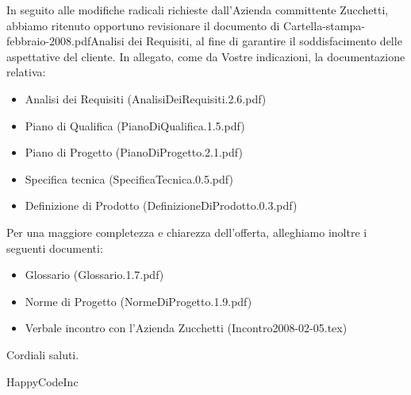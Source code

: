 \documentclass[11pt,titlepage,a4paper]{report}
\begin{document}
In seguito alle modifiche radicali richieste dall'Azienda committente Zucchetti, abbiamo ritenuto opportuno revisionare il documento di Cartella-stampa-febbraio-2008.pdfAnalisi dei Requisiti, al fine di garantire il soddisfacimento delle aspettative del cliente. \newline
In allegato, come da Vostre indicazioni, la documentazione relativa:
\begin{itemize}
\item{}Analisi dei Requisiti (AnalisiDeiRequisiti.2.6.pdf)
\item{}Piano di Qualifica (PianoDiQualifica.1.5.pdf)
\item{}Piano di Progetto (PianoDiProgetto.2.1.pdf)
\item{}Specifica tecnica (SpecificaTecnica.0.5.pdf) 
\item{}Definizione di Prodotto (DefinizioneDiProdotto.0.3.pdf)
\end{itemize}
Per una maggiore completezza e chiarezza dell'offerta, alleghiamo inoltre i seguenti documenti:
\begin{itemize}
\item{}Glossario (Glossario.1.7.pdf)
\item{}Norme di Progetto (NormeDiProgetto.1.9.pdf)
\item{}Verbale incontro con l'Azienda Zucchetti (Incontro2008-02-05.tex)
\end{itemize}
Cordiali saluti.
\begin{flushright}
HappyCodeInc
\end{flushright}
\newpage
\end{document}
